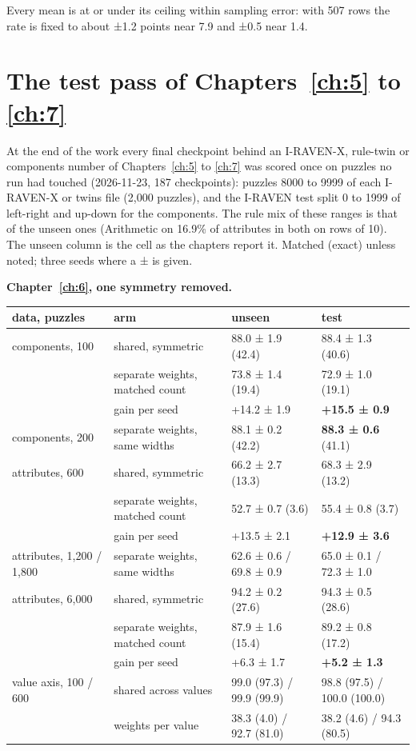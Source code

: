 Every mean is at or under its ceiling within sampling error: with 507 rows the rate is fixed to about ±1.2 points near 7.9 and ±0.5 near 1.4.

\section{The test pass of Chapters~\ref{ch:5} to \ref{ch:7}}\label{sec:D.6}

At the end of the work every final checkpoint behind an I-RAVEN-X, rule-twin or components number of Chapters~\ref{ch:5} to \ref{ch:7} was scored once on puzzles no run had touched (2026-11-23, 187 checkpoints): puzzles 8000 to 9999 of each I-RAVEN-X or twins file (2,000 puzzles), and the I-RAVEN test split 0 to 1999 of left-right and up-down for the components. The rule mix of these ranges is that of the unseen ones (Arithmetic on 16.9\% of attributes in both on rows of 10). The unseen column is the cell as the chapters report it. Matched (exact) unless noted; three seeds where a ± is given.

\textbf{Chapter~\ref{ch:6}, one symmetry removed.}

\begin{center}\small
\begin{tabularx}{\linewidth}{@{}YYYY@{}}
\toprule
data, puzzles & arm & unseen & test \\
\midrule
components, 100 & shared, symmetric & 88.0 ± 1.9 (42.4) & 88.4 ± 1.3 (40.6) \\
 & separate weights, matched count & 73.8 ± 1.4 (19.4) & 72.9 ± 1.0 (19.1) \\
 & gain per seed & +14.2 ± 1.9 & \textbf{+15.5 ± 0.9} \\
components, 200 & separate weights, same widths & 88.1 ± 0.2 (42.2) & \textbf{88.3 ± 0.6} (41.1) \\
attributes, 600 & shared, symmetric & 66.2 ± 2.7 (13.3) & 68.3 ± 2.9 (13.2) \\
 & separate weights, matched count & 52.7 ± 0.7 (3.6) & 55.4 ± 0.8 (3.7) \\
 & gain per seed & +13.5 ± 2.1 & \textbf{+12.9 ± 3.6} \\
attributes, 1,200 / 1,800 & separate weights, same widths & 62.6 ± 0.6 / 69.8 ± 0.9 & 65.0 ± 0.1 / 72.3 ± 1.0 \\
attributes, 6,000 & shared, symmetric & 94.2 ± 0.2 (27.6) & 94.3 ± 0.5 (28.6) \\
 & separate weights, matched count & 87.9 ± 1.6 (15.4) & 89.2 ± 0.8 (17.2) \\
 & gain per seed & +6.3 ± 1.7 & \textbf{+5.2 ± 1.3} \\
value axis, 100 / 600 & shared across values & 99.0 (97.3) / 99.9 (99.9) & 98.8 (97.5) / 100.0 (100.0) \\
 & weights per value & 38.3 (4.0) / 92.7 (81.0) & 38.2 (4.6) / 94.3 (80.5) \\
\bottomrule
\end{tabularx}
\end{center}

